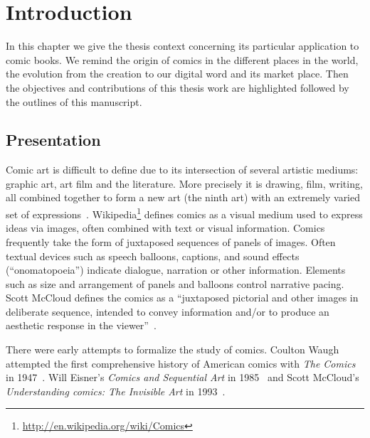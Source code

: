 \chapter{Introduction}%
\label{chap:intro}
\graphicspath{{./chapters/1-intro/figs/}}

In this chapter we give the thesis context concerning its particular application to comic books.
We remind the origin of comics in the different places in the world, the evolution from the creation to our digital word and its market place.
Then the objectives and contributions of this thesis work are highlighted followed by the outlines of this manuscript.


\section{Presentation} %
\label{sec:intro:presentation}
Comic art is difficult to define due to its intersection of several artistic mediums: graphic art, art film and the literature.
More precisely it is drawing, film, writing, all combined together to form a new art (the ninth art) with an extremely varied set of expressions~\cite{duc1997art}.
Wikipedia\footnote{\url{http://en.wikipedia.org/wiki/Comics}} defines comics as a visual medium used to express ideas via images, often combined with text or visual information.
Comics frequently take the form of juxtaposed sequences of panels of images.
Often textual devices such as speech balloons, captions, and sound effects (``onomatopoeia'') indicate dialogue, narration or other information.
Elements such as size and arrangement of panels and balloons control narrative pacing.
Scott McCloud defines the comics as a ``juxtaposed pictorial and other images in deliberate sequence, intended to convey information and/or to produce an aesthetic response in the viewer''~\cite{mccloud1994understanding}.

There were early attempts to formalize the study of comics. 
Coulton Waugh attempted the first comprehensive history of American comics with \emph{The Comics} in 1947~\cite{Coulton1947Comics}.
Will Eisner's \emph{Comics and Sequential Art} in 1985~\cite{Eisner1985Comics} and Scott McCloud's \emph{Understanding comics: The Invisible Art} in 1993~\cite{mccloud1994understanding}.


